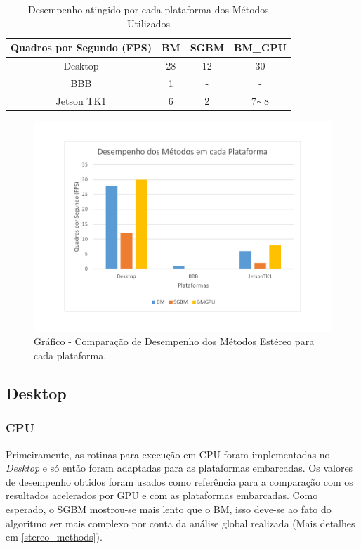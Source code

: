 \begin{table}[]
\centering
\caption{Desempenho atingido por cada plataforma dos Métodos Utilizados}
\label{resultsCPUGPU}
\begin{tabular}{|c|c|c|c|}
\hline
Quadros por Segundo (FPS)       & BM & SGBM & BM\_GPU  \\ \hline
Desktop   & 28 & 12   & 30       \\ \hline
BBB       & 1  & -    & -        \\ \hline
Jetson TK1 & 6  & 2    & 7$\sim$8 \\ \hline
\end{tabular}
\end{table}

\begin{figure}[H]
 	\centering
 	\includegraphics[scale=0.5]{./Resources/grafico_desempenho.pdf}
 	\caption{Gráfico - Comparação de Desempenho dos Métodos Estéreo para cada plataforma.}
 	\label{grafico_desempenho}
\end{figure}


\subsection{Desktop}
\subsubsection{CPU}

Primeiramente, as rotinas para execução em CPU foram implementadas no \textit{Desktop} e só então foram adaptadas para as plataformas embarcadas. Os valores de desempenho obtidos foram usados como referência para a comparação com os resultados acelerados por GPU e com as plataformas embarcadas. Como esperado, o SGBM mostrou-se mais lento que o BM, isso deve-se ao fato do algoritmo ser mais complexo por conta da análise global realizada (Mais detalhes em \ref{stereo_methods}). 

